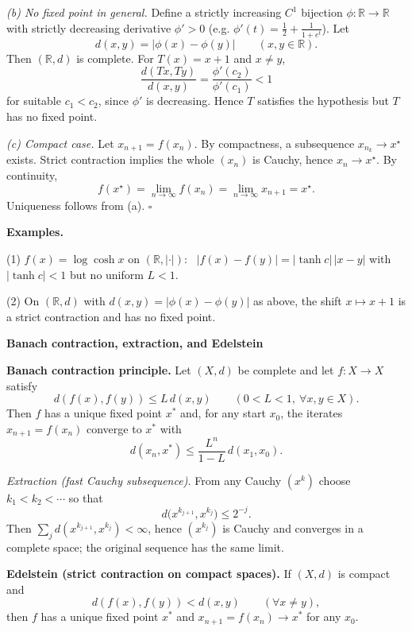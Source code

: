 \documentclass[12pt,a4paper]{article}
\newcommand{\qed}{\hfill$\square$}
\begin{document}
\emph{(b) No fixed point in general.}
Define a strictly increasing $C^1$ bijection $\phi:\mathbb R\to\mathbb R$
with strictly decreasing derivative $\phi'>0$ (e.g. $\phi'(t)=\tfrac12+\frac{1}{1+e^{t}}$).
Let
\[
d(x,y)=|\phi(x)-\phi(y)| \qquad (x,y\in\mathbb R).
\]
Then $(\mathbb R,d)$ is complete.
For $T(x)=x+1$ and $x\neq y$,
\[
\frac{d(Tx,Ty)}{d(x,y)}
=\frac{\phi'(c_2)}{\phi'(c_1)}<1
\]
for suitable $c_1<c_2$, since $\phi'$ is decreasing.
Hence $T$ satisfies the hypothesis but $T$ has no fixed point.

\medskip
\emph{(c) Compact case.}
Let $x_{n+1}=f(x_n)$. By compactness, a subsequence $x_{n_k}\to x^\star$ exists.
Strict contraction implies the whole $(x_n)$ is Cauchy, hence $x_n\to x^\star$.
By continuity,
\[
f(x^\star)=\lim_{n\to\infty} f(x_n)=\lim_{n\to\infty} x_{n+1}=x^\star.
\]
Uniqueness follows from (a).
\qed

\medskip\medskip
\textbf{Examples.}

(1) $f(x)=\log\cosh x$ on $(\mathbb R,|\cdot|)$:
\ $|f(x)-f(y)|=|\tanh c|\,|x-y|$ with $|\tanh c|<1$ but no uniform $L<1$.

(2) On $(\mathbb R,d)$ with $d(x,y)=|\phi(x)-\phi(y)|$ as above,
the shift $x\mapsto x+1$ is a strict contraction and has no fixed point.
	
	

\noindent\Large\bfseries Banach contraction, extraction, and Edelstein\par\normalfont\normalsize

\medskip
\textbf{Banach contraction principle.}
Let $(X,d)$ be complete and let $f:X\to X$ satisfy
\[
d(f(x),f(y)) \le L\, d(x,y)\qquad (0<L<1,\ \forall x,y\in X).
\]
Then $f$ has a unique fixed point $x^{*}$ and, for any start $x_{0}$, the iterates $x_{n+1}=f(x_{n})$ converge to $x^{*}$ with
\[
d(x_{n},x^{*}) \le \frac{L^{n}}{1-L}\, d(x_{1},x_{0}).
\]

\medskip
\textit{Extraction (fast Cauchy subsequence).}
From any Cauchy $(x^{k})$ choose $k_{1}<k_{2}<\cdots$ so that
\[
d\big(x^{k_{j+1}},x^{k_{j}}\big)\le 2^{-j}.
\]
Then $\sum_{j} d(x^{k_{j+1}},x^{k_{j}})<\infty$, hence $(x^{k_{j}})$ is Cauchy and converges in a complete space; the original sequence has the same limit.

\medskip
\textbf{Edelstein (strict contraction on compact spaces).}
If $(X,d)$ is compact and
\[
d(f(x),f(y))<d(x,y)\qquad (\forall x\neq y),
\]
then $f$ has a unique fixed point $x^{*}$ and $x_{n+1}=f(x_{n})\to x^{*}$ for any $x_{0}$.
\end{document}
